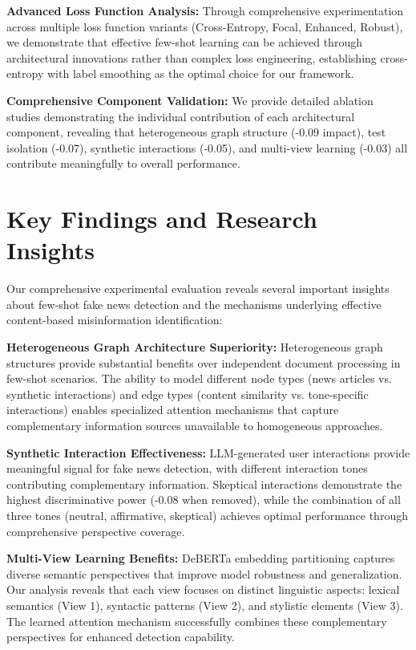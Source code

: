 \textbf{Advanced Loss Function Analysis:} Through comprehensive experimentation across multiple loss function variants (Cross-Entropy, Focal, Enhanced, Robust), we demonstrate that effective few-shot learning can be achieved through architectural innovations rather than complex loss engineering, establishing cross-entropy with label smoothing as the optimal choice for our framework.

\textbf{Comprehensive Component Validation:} We provide detailed ablation studies demonstrating the individual contribution of each architectural component, revealing that heterogeneous graph structure (-0.09 impact), test isolation (-0.07), synthetic interactions (-0.05), and multi-view learning (-0.03) all contribute meaningfully to overall performance.

\section{Key Findings and Research Insights}

Our comprehensive experimental evaluation reveals several important insights about few-shot fake news detection and the mechanisms underlying effective content-based misinformation identification:

\textbf{Heterogeneous Graph Architecture Superiority:} Heterogeneous graph structures provide substantial benefits over independent document processing in few-shot scenarios. The ability to model different node types (news articles vs. synthetic interactions) and edge types (content similarity vs. tone-specific interactions) enables specialized attention mechanisms that capture complementary information sources unavailable to homogeneous approaches.

\textbf{Synthetic Interaction Effectiveness:} LLM-generated user interactions provide meaningful signal for fake news detection, with different interaction tones contributing complementary information. Skeptical interactions demonstrate the highest discriminative power (-0.08 when removed), while the combination of all three tones (neutral, affirmative, skeptical) achieves optimal performance through comprehensive perspective coverage.

\textbf{Multi-View Learning Benefits:} DeBERTa embedding partitioning captures diverse semantic perspectives that improve model robustness and generalization. Our analysis reveals that each view focuses on distinct linguistic aspects: lexical semantics (View 1), syntactic patterns (View 2), and stylistic elements (View 3). The learned attention mechanism successfully combines these complementary perspectives for enhanced detection capability.

